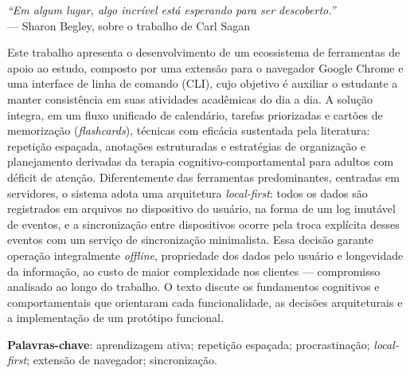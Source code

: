 \documentclass[12pt, %
openright, 
oneside,
a4paper,
english,   %
brazil]{facom-ufu-abntex2}
\begin{document}
\begin{epigrafe}
    \vspace*{\fill}
	\begin{flushright}
		\textit{``Em algum lugar, algo incrível está esperando para ser descoberto.''}\\
		--- Sharon Begley, sobre o trabalho de Carl Sagan
	\end{flushright}
\end{epigrafe}


\begin{resumo}
Este trabalho apresenta o desenvolvimento de um ecossistema de ferramentas de apoio ao estudo, 
composto por uma extensão para o navegador Google Chrome e uma interface de linha de comando (CLI),
cujo objetivo é auxiliar o estudante a manter consistência em suas atividades acadêmicas do dia a dia.
A solução integra, em um fluxo unificado de calendário, tarefas priorizadas e cartões de memorização (\textit{flashcards}), 
técnicas com eficácia sustentada pela literatura: repetição espaçada, anotações estruturadas e estratégias de organização e planejamento derivadas 
da terapia cognitivo-comportamental para adultos com déficit de atenção. Diferentemente das ferramentas predominantes,
centradas em servidores, o sistema adota uma arquitetura \textit{local-first}: todos os dados são registrados em arquivos no dispositivo do usuário, na forma de um log imutável de eventos, e a sincronização entre dispositivos ocorre pela troca explícita desses eventos com um serviço de sincronização minimalista. Essa decisão garante operação integralmente \textit{offline}, propriedade dos dados pelo usuário e longevidade da informação, ao custo de maior complexidade nos clientes --- compromisso analisado ao longo do trabalho. O texto discute os fundamentos cognitivos e comportamentais que orientaram cada funcionalidade, as decisões arquiteturais e a implementação de um protótipo funcional.

\textbf{Palavras-chave}: aprendizagem ativa; repetição espaçada; procrastinação; \textit{local-first}; extensão de navegador; sincronização. %
\end{resumo}
\end{document}
